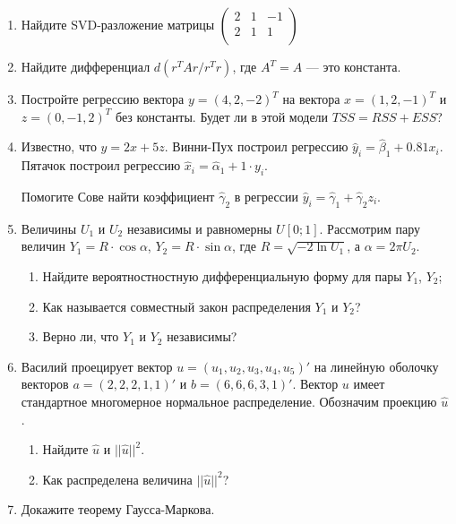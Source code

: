 \documentclass[12pt]{article}
\begin{document}

\begin{enumerate}
  \item Найдите SVD-разложение матрицы $
  \begin{pmatrix}
  2 & 1 & -1 \\
  2 & 1 & 1 \\
  \end{pmatrix}$
 \item Найдите дифференциал $d (r^TAr/r^T r)$, где $A^T=A$ — это константа.
 \item Постройте регрессию вектора $y = (4,2,-2)^T$ на вектора $x=(1,2,-1)^T$ и $z=(0,-1,2)^T$ без константы. Будет ли в этой модели $TSS=RSS+ESS$?
 \item Известно, что $y=2x + 5z$. Винни-Пух построил регрессию $\hat y_i = \hat\beta_1 + 0.81 x_i$.
 Пятачок построил регрессию $\hat x_i = \hat \alpha_1 + 1\cdot y_i$.

 Помогите Сове найти коэффициент $\hat \gamma_2$ в регрессии $\hat y_i = \hat\gamma_1 + \hat\gamma_2 z_i$.

\item Величины $U_1$ и $U_2$ независимы и равномерны $U[0;1]$. Рассмотрим пару величин $Y_1 = R\cdot \cos \alpha$, $Y_2 = R\cdot \sin \alpha$, где $R=\sqrt{-2\ln U_1}$, а $\alpha = 2\pi U_2$.
\begin{enumerate}
  \item Найдите вероятностностную дифференциальную форму для пары $Y_1$, $Y_2$;
  \item Как называется совместный закон распределения $Y_1$ и $Y_2$?
  \item Верно ли, что $Y_1$ и $Y_2$ независимы?
\end{enumerate}

 \item Василий проецирует вектор $u=(u_1, u_2, u_3, u_4, u_5)'$ на линейную оболочку векторов $a=(2,2,2,1,1)'$ и $b=(6,6,6,3,1)'$. Вектор $u$ имеет стандартное многомерное нормальное распределение. Обозначим проекцию $\hat u$.
\begin{enumerate}
  \item Найдите $\hat u$ и $||\hat u||^2$.
  \item Как распределена величина $||\hat u||^2$?
\end{enumerate}

 \item Докажите теорему Гаусса-Маркова.

\end{enumerate}
\end{document}
